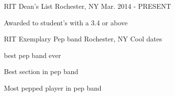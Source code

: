 \begin{cventries}
  \cventry
    {RIT}
    {Dean's List}
    {Rochester, NY}
    {Mar. 2014 - PRESENT}
    {
    \begin{cvitems}
    	\item{Awarded to student's with a 3.4 or above}
    \end{cvitems}
    }
    
    \cventry
    {RIT}
    {Exemplary Pep band}
    {Rochester, NY}
    {Cool dates}
     {
    \begin{cvitems}
    	\item{best pep band ever}	
	\item{Best section in pep band}	
	\item{Most pepped player in pep band}
    \end{cvitems}
    }

\end{cventries}
